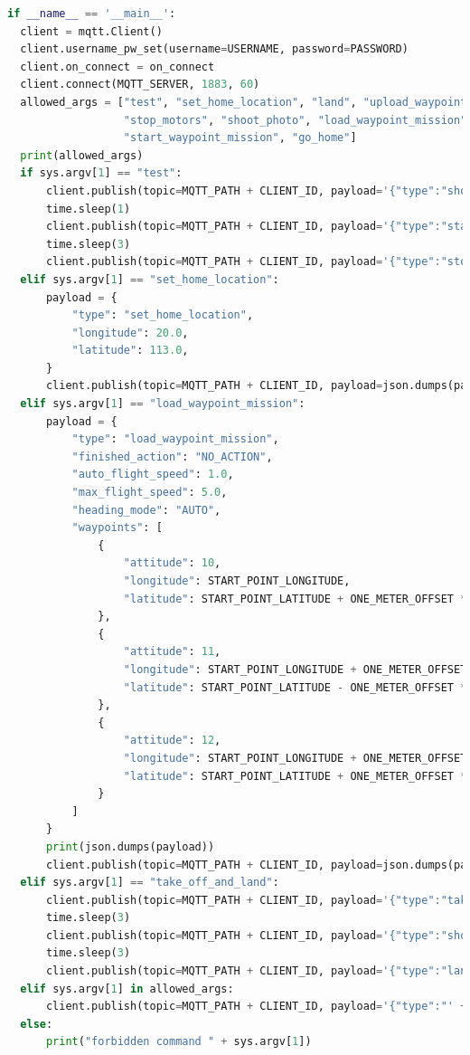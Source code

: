 \newpage
\begin{lstlisting}[language=Python, caption=Skryt przeznaczony do publikowania na nasłuchiwanym przez urządzenie latające Topic-u komend.]
  if __name__ == '__main__':
  client = mqtt.Client()
  client.username_pw_set(username=USERNAME, password=PASSWORD)
  client.on_connect = on_connect
  client.connect(MQTT_SERVER, 1883, 60)
  allowed_args = ["test", "set_home_location", "land", "upload_waypoint_mission", "take_off", "start_motors",
                  "stop_motors", "shoot_photo", "load_waypoint_mission", "take_off_and_land", "stop_waypoint_mission",
                  "start_waypoint_mission", "go_home"]
  print(allowed_args)
  if sys.argv[1] == "test":
      client.publish(topic=MQTT_PATH + CLIENT_ID, payload='{"type":"shoot_photo"}')
      time.sleep(1)
      client.publish(topic=MQTT_PATH + CLIENT_ID, payload='{"type":"start_motors"}')
      time.sleep(3)
      client.publish(topic=MQTT_PATH + CLIENT_ID, payload='{"type":"stop_motors"}')
  elif sys.argv[1] == "set_home_location":
      payload = {
          "type": "set_home_location",
          "longitude": 20.0,
          "latitude": 113.0,
      }
      client.publish(topic=MQTT_PATH + CLIENT_ID, payload=json.dumps(payload))
  elif sys.argv[1] == "load_waypoint_mission":
      payload = {
          "type": "load_waypoint_mission",
          "finished_action": "NO_ACTION",
          "auto_flight_speed": 1.0,
          "max_flight_speed": 5.0,
          "heading_mode": "AUTO",
          "waypoints": [
              {
                  "attitude": 10,
                  "longitude": START_POINT_LONGITUDE,
                  "latitude": START_POINT_LATITUDE + ONE_METER_OFFSET * 0.5
              },
              {
                  "attitude": 11,
                  "longitude": START_POINT_LONGITUDE + ONE_METER_OFFSET * 1,
                  "latitude": START_POINT_LATITUDE - ONE_METER_OFFSET * 1
              },
              {
                  "attitude": 12,
                  "longitude": START_POINT_LONGITUDE + ONE_METER_OFFSET * 2,
                  "latitude": START_POINT_LATITUDE + ONE_METER_OFFSET * 1
              }
          ]
      }
      print(json.dumps(payload))
      client.publish(topic=MQTT_PATH + CLIENT_ID, payload=json.dumps(payload))
  elif sys.argv[1] == "take_off_and_land":
      client.publish(topic=MQTT_PATH + CLIENT_ID, payload='{"type":"take_off"}')
      time.sleep(3)
      client.publish(topic=MQTT_PATH + CLIENT_ID, payload='{"type":"shoot_photo"}')
      time.sleep(3)
      client.publish(topic=MQTT_PATH + CLIENT_ID, payload='{"type":"land"}')
  elif sys.argv[1] in allowed_args:
      client.publish(topic=MQTT_PATH + CLIENT_ID, payload='{"type":"' + sys.argv[1] + '"}')
  else:
      print("forbidden command " + sys.argv[1])
\end{lstlisting}

